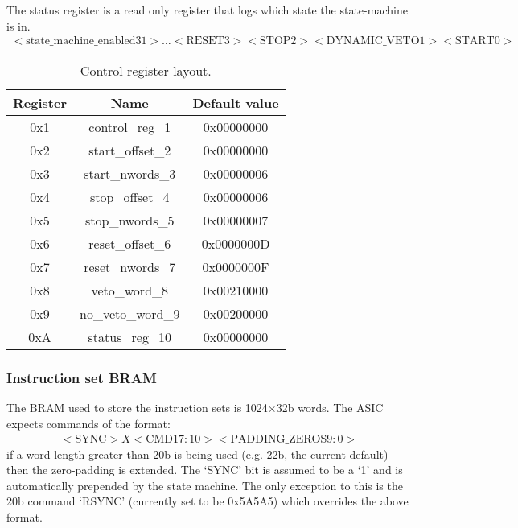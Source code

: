 \documentclass[]{article}
\begin{document}
      The status register is a read only register that logs which state the state-machine is in.
      \begin{align} \label{fmt:status_reg}
        <\text{state\_machine\_enabled} 31>\ldots<\text{RESET} 3> <\text{STOP} 2> <\text{DYNAMIC\_VETO} 1> <\text{START} 0>
      \end{align}
	  
      \begin{table}
        \begin{center}
        \begin{tabular}{c|c|c}
          Register & Name              & Default value  \\
          \hline                     
          0x1      & control\_reg\_1   & 0x00000000     \\ 
          0x2      & start\_offset\_2  & 0x00000000     \\  
          0x3      & start\_nwords\_3  & 0x00000006     \\ 
          0x4      & stop\_offset\_4   & 0x00000006     \\ 
          0x5      & stop\_nwords\_5   & 0x00000007     \\ 
          0x6      & reset\_offset\_6  & 0x0000000D     \\ 
          0x7      & reset\_nwords\_7  & 0x0000000F     \\ 
          0x8      & veto\_word\_8     & 0x00210000     \\ 
          0x9      & no\_veto\_word\_9 & 0x00200000     \\ 
          0xA      & status\_reg\_10   & 0x00000000     \\ 
        \end{tabular}
        \end{center}
        \caption{Control register layout.}
        \label{tab:ctrl_reg_default}
      \end{table}


    \subsubsection{Instruction set BRAM} %
    \label{sub:tx_bram}
      The BRAM used to store the instruction sets is 1024\(\times\)32b words. The ASIC expects commands of the format:
      \begin{align}\label{fmt:asic_format}
        <\text{SYNC}>X<\text{CMD} 17:10><\text{PADDING\_ZEROS} 9:0>
      \end{align}
      if a word length greater than 20b is being used (e.g. 22b, the current default) then the zero-padding is extended. The `SYNC' bit is assumed to be a `1' and is automatically prepended by the state machine. The only exception to this is the 20b command `RSYNC' (currently set to be 0x5A5A5) which overrides the above format.
\end{document}
